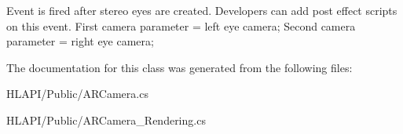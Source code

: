 Event is fired after stereo eyes are created. Developers can add post effect scripts on this event. First camera parameter = left eye camera; Second camera parameter = right eye camera; 



The documentation for this class was generated from the following files\+:\begin{DoxyCompactItemize}
\item 
H\+L\+A\+P\+I/\+Public/A\+R\+Camera.\+cs\item 
H\+L\+A\+P\+I/\+Public/A\+R\+Camera\+\_\+\+Rendering.\+cs\end{DoxyCompactItemize}
